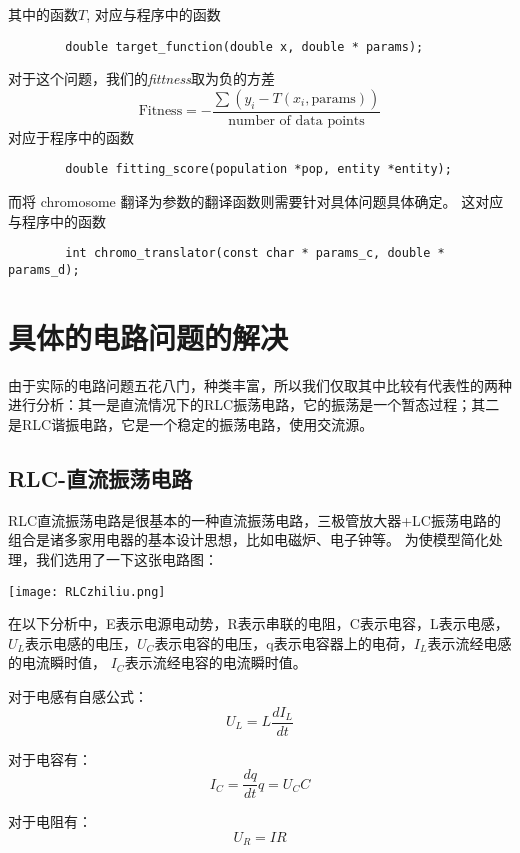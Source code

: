 \documentclass[a4paper]{article}
\begin{document}
其中的函数$T$, 对应与程序中的函数
\begin{verbatim}
        double target_function(double x, double * params);
\end{verbatim}

对于这个问题，我们的\emph{fittness}取为负的方差
\begin{equation}
	\text{Fitness} = - \frac{\sum (y_i - T(x_i, \text{params}))}{\text{number of data points}} 
\end{equation}
对应于程序中的函数
\begin{verbatim}
        double fitting_score(population *pop, entity *entity);
\end{verbatim}

而将 chromosome 翻译为参数的翻译函数则需要针对具体问题具体确定。
这对应与程序中的函数
\begin{verbatim}
        int chromo_translator(const char * params_c, double * params_d);
\end{verbatim}

\section{具体的电路问题的解决}
由于实际的电路问题五花八门，种类丰富，所以我们仅取其中比较有代表性的两种进行分析：其一是直流情况下的RLC振荡电路，它的振荡是一个暂态过程；其二是RLC谐振电路，它是一个稳定的振荡电路，使用交流源。
\subsection{RLC-直流振荡电路}
RLC直流振荡电路是很基本的一种直流振荡电路，三极管放大器+LC振荡电路的组合是诸多家用电器的基本设计思想，比如电磁炉、电子钟等。
为使模型简化处理，我们选用了一下这张电路图：

\texttt{[image: RLCzhiliu.png]}

在以下分析中，E表示电源电动势，R表示串联的电阻，C表示电容，L表示电感，$U_L$表示电感的电压，$U_C$表示电容的电压，q表示电容器上的电荷，$I_L$表示流经电感的电流瞬时值，
$I_C$表示流经电容的电流瞬时值。

对于电感有自感公式：
\begin{equation}
U_L=L\frac{dI_L}{dt}
\end{equation}

对于电容有：
\begin{equation}
I_C=\frac{dq}{dt}
q=U_CC
\end{equation}

对于电阻有：
\begin{equation}
U_R=IR
\end{equation}
\end{document}
